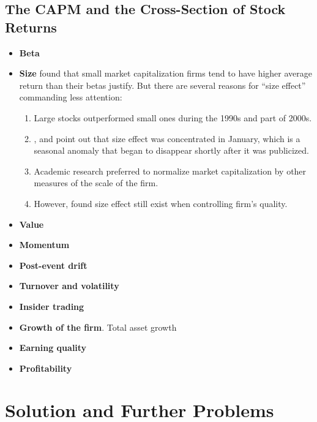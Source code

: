 \documentclass[11pt,green,twocol,citestyle=authoryear, bibstyle=authoryear]{elegantbook}
\begin{document}
\subsection{The CAPM and the Cross-Section of Stock Returns}
\begin{itemize}
    \item \textbf{Beta} 
    \item \textbf{Size}  \cite{Banz1981} found that small market capitalization firms tend to have higher average return than their betas justify. But there are several reasons for ``size effect'' commanding less attention:
    \begin{enumerate}
        \item Large stocks outperformed small ones during the 1990s and part of 2000s.
        \item \cite{Keim1983}, and \cite{Reinganum1983} point out that size effect was concentrated in January, which is a seasonal anomaly that began to disappear shortly after it was publicized.
        \item Academic research preferred to normalize market capitalization by other measures of the scale of the firm.
        \item However, \cite{Asness2018} found size effect still exist when controlling firm's quality.
    \end{enumerate}
    \item \textbf{Value}
    \item \textbf{Momentum}
    \item \textbf{Post-event drift}
    \item \textbf{Turnover and volatility}
    \item \textbf{Insider trading}
    \item \textbf{Growth of the firm}. Total asset growth
    \item \textbf{Earning quality}
    \item \textbf{Profitability}
\end{itemize}

\section{Solution and Further Problems}
\end{document}
